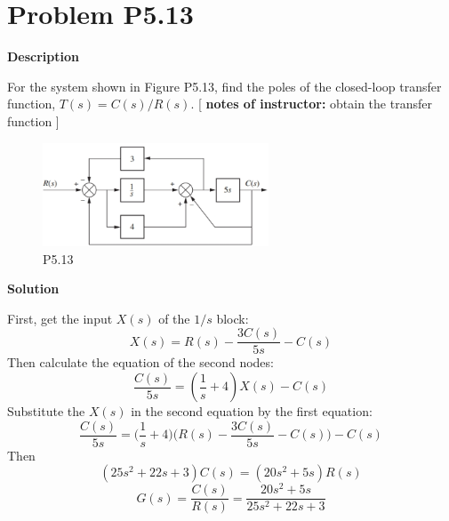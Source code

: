 \documentclass[a4paper]{article}
\begin{document}
\section{Problem P5.13}
{\par\noindent \bf\large  Description   \par}
For the system shown in Figure P5.13, find the poles of the closed-loop transfer function, $T(s)=C(s)/R(s)$. [ {\bf notes of instructor: }obtain the transfer function  ] 
\begin{figure}[H]
\centering
\includegraphics[width=0.6\textwidth]{pic/ch5_13.png}
\caption{P5.13} 
\end{figure}

{\par\noindent\bf\large Solution \par}
First, get the input $X(s)$ of the $1/s$ block:
$$ 
X(s) = R(s) - \frac{3C(s)}{5s} - C(s)
$$
Then calculate the equation of the second nodes:
$$ 
\frac{C(s)}{5s} = (\frac{1}{s} + 4)X(s) - C(s)
$$
Substitute the $X(s)$ in the second equation by the first equation:
$$ 
\frac{C(s)}{5s} = \Big(\frac{1}{s} + 4\Big)\Big(R(s) - \frac{3C(s)}{5s} - C(s)\Big) - C(s)
$$
Then
$$
(25s^2 + 22s + 3) C(s) = (20s^2 + 5s)R(s)
$$
$$
G(s) = \frac{C(s)}{R(s)} = \frac{20s^2 + 5s}{25s^2 + 22s + 3}
$$
\end{document}
